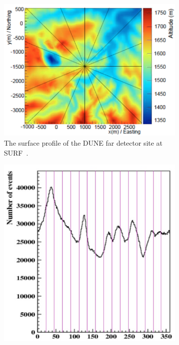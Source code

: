 \begin{figure}
  \centering
  \begin{subfigure}{0.56\textwidth}
    \centering
    \includegraphics[width=\textwidth]{dune-surface-map}
    \caption{The surface profile of the DUNE far detector site at SURF~\citep{LBNE3144}.}
    \label{fig:SurfProf_Col}
  \end{subfigure}%
  \hspace{0.03\textwidth}%
  \begin{subfigure}{0.4\textwidth}
    \centering
    \includegraphics[width=\textwidth]{phi-map}

\end{subfigure}
\end{figure}
